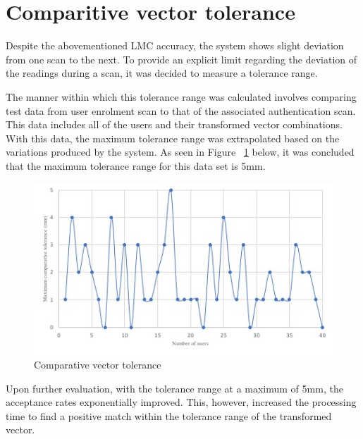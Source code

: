 \section{Comparitive vector tolerance}

Despite the abovementioned LMC accuracy, the system shows slight deviation from one scan to the next. To provide an explicit limit regarding the deviation of the readings during a scan, it was decided to measure a tolerance range.

The manner within which this tolerance range was calculated involves comparing test data from user enrolment scan to that of the associated authentication scan. This data includes all of the users and their transformed vector combinations. With this data, the maximum tolerance range was extrapolated based on the variations produced by the system. As seen in Figure ~\ref{fig:Comparative vector tolerance} below, it was concluded that the maximum tolerance range for this data set is 5mm.

    
    \begin{figure}[htbp!] 
    \centering    
    \includegraphics[width=1.0\textwidth]{Chapter4/Figs/ComparitiveVectorTolerance.jpg}
    \caption[Comparative vector tolerance]{Comparative vector tolerance}
    \label{fig:Comparative vector tolerance}
    \end{figure}

Upon further evaluation, with the tolerance range at a maximum of 5mm, the acceptance rates exponentially improved. This, however, increased the processing time to find a positive match within the tolerance range of the transformed vector. 


